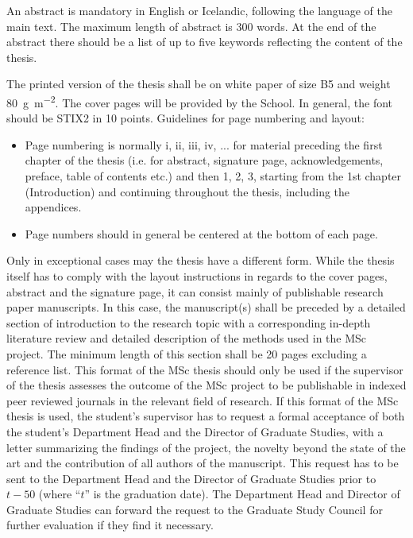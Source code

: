 An abstract is mandatory in English or Icelandic, following the language of the main text.
The maximum length of abstract is 300 words.
At the end of the abstract there should be a list of up to five keywords reflecting the content of the thesis.

The printed version of the thesis shall be on white paper of size B5 and weight \SI{80}{\gram\per\square\meter}.
The cover pages will be provided by the School. In general, the font should be STIX2 in 10 points.
Guidelines for page numbering and layout:

\begin{itemize}
\item Page numbering is normally i, ii, iii, iv, ... for material preceding the first chapter of the thesis (i.e. for abstract, signature page, acknowledgements, preface, table of contents etc.) and then
1, 2, 3, starting from the 1st chapter (Introduction) and continuing throughout the thesis, including the appendices.
\item Page numbers should in general be centered at the bottom of each page.
\end{itemize}
Only in exceptional cases may the thesis have a different form.
While the thesis itself has to comply with the layout instructions in regards to the cover pages, abstract and the signature page, it can consist mainly of publishable research paper manuscripts.
In this case, the manuscript(s) shall be preceded by a detailed section of introduction to the research topic with a corresponding in-depth literature review and detailed description of the methods used in the MSc project.
The minimum length of this section shall be 20 pages excluding a reference list.
This format of the MSc thesis should only be used if the supervisor of the thesis assesses the outcome of the MSc project to be publishable in indexed peer reviewed journals in the relevant field of research.
If this format of the MSc thesis is used, the student's supervisor has to request a formal acceptance of both the student's Department Head and the Director of Graduate Studies, with a letter summarizing the findings of the project, the novelty beyond the state of the art and the contribution of all authors of the manuscript.
This request has to be sent to the Department Head and the Director of Graduate Studies prior to $t-50$ (where “$t$” is the graduation date).
The Department Head and Director of Graduate Studies can forward the request to the Graduate Study Council for further evaluation if they find it necessary.

